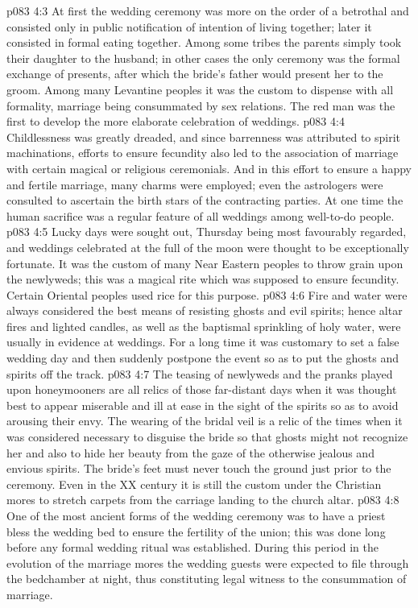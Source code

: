 \vs p083 4:3 At first the wedding ceremony was more on the order of a betrothal and consisted only in public notification of intention of living together; later it consisted in formal eating together. Among some tribes the parents simply took their daughter to the husband; in other cases the only ceremony was the formal exchange of presents, after which the bride’s father would present her to the groom. Among many Levantine peoples it was the custom to dispense with all formality, marriage being consummated by sex relations. The red man was the first to develop the more elaborate celebration of weddings.
\vs p083 4:4 \pc Childlessness was greatly dreaded, and since barrenness was attributed to spirit machinations, efforts to ensure fecundity also led to the association of marriage with certain magical or religious ceremonials. And in this effort to ensure a happy and fertile marriage, many charms were employed; even the astrologers were consulted to ascertain the birth stars of the contracting parties. At one time the human sacrifice was a regular feature of all weddings among well\hyp{}to\hyp{}do people.
\vs p083 4:5 Lucky days were sought out, Thursday being most favourably regarded, and weddings celebrated at the full of the moon were thought to be exceptionally fortunate. It was the custom of many Near Eastern peoples to throw grain upon the newlyweds; this was a magical rite which was supposed to ensure fecundity. Certain Oriental peoples used rice for this purpose.
\vs p083 4:6 Fire and water were always considered the best means of resisting ghosts and evil spirits; hence altar fires and lighted candles, as well as the baptismal sprinkling of holy water, were usually in evidence at weddings. For a long time it was customary to set a false wedding day and then suddenly postpone the event so as to put the ghosts and spirits off the track.
\vs p083 4:7 The teasing of newlyweds and the pranks played upon honeymooners are all relics of those far\hyp{}distant days when it was thought best to appear miserable and ill at ease in the sight of the spirits so as to avoid arousing their envy. The wearing of the bridal veil is a relic of the times when it was considered necessary to disguise the bride so that ghosts might not recognize her and also to hide her beauty from the gaze of the otherwise jealous and envious spirits. The bride’s feet must never touch the ground just prior to the ceremony. Even in the XX century it is still the custom under the Christian mores to stretch carpets from the carriage landing to the church altar.
\vs p083 4:8 One of the most ancient forms of the wedding ceremony was to have a priest bless the wedding bed to ensure the fertility of the union; this was done long before any formal wedding ritual was established. During this period in the evolution of the marriage mores the wedding guests were expected to file through the bedchamber at night, thus constituting legal witness to the consummation of marriage.
